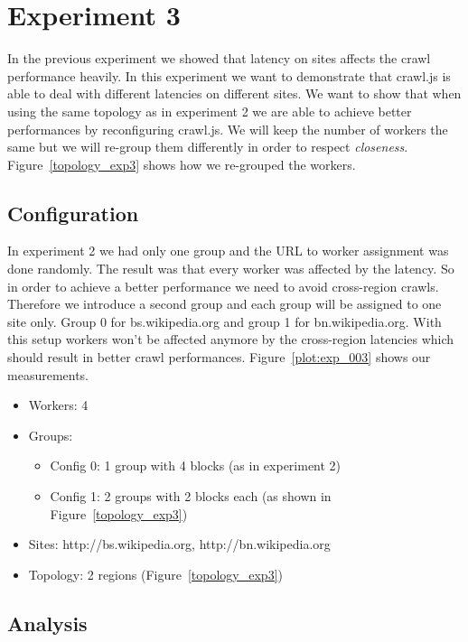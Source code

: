 \section{Experiment 3}

In the previous experiment we showed that latency on sites affects the crawl performance heavily. In this experiment we want to demonstrate that crawl.js is able to deal with different latencies on different sites. We want to show that when using the same topology as in experiment 2 we are able to achieve better performances by reconfiguring crawl.js. We will keep the number of workers the same but we will re-group them differently in order to respect \emph{closeness}. Figure~\ref{topology_exp3} shows how we re-grouped the workers. 

\subsection{Configuration}
In experiment 2 we had only one group and the URL to worker assignment was done randomly. The result was that every worker was affected by the latency. So in order to achieve a better performance we need to avoid cross-region crawls. Therefore we introduce a second group and each group will be assigned to one site only. Group 0 for bs.wikipedia.org and group 1 for bn.wikipedia.org. With this setup workers won't be affected anymore by the cross-region latencies which should result in better crawl performances. Figure~\ref{plot:exp_003} shows our measurements.
\begin{itemize}
  \item Workers: 4
  \item Groups:
    \begin{itemize}
      \item Config 0: 1 group with 4 blocks (as in experiment 2)
      \item Config 1: 2 groups with 2 blocks each (as shown in Figure~\ref{topology_exp3})
    \end{itemize}
  \item Sites: http://bs.wikipedia.org, http://bn.wikipedia.org
  \item Topology: 2 regions (Figure~\ref{topology_exp3})
\end{itemize}

\subsection{Analysis}

